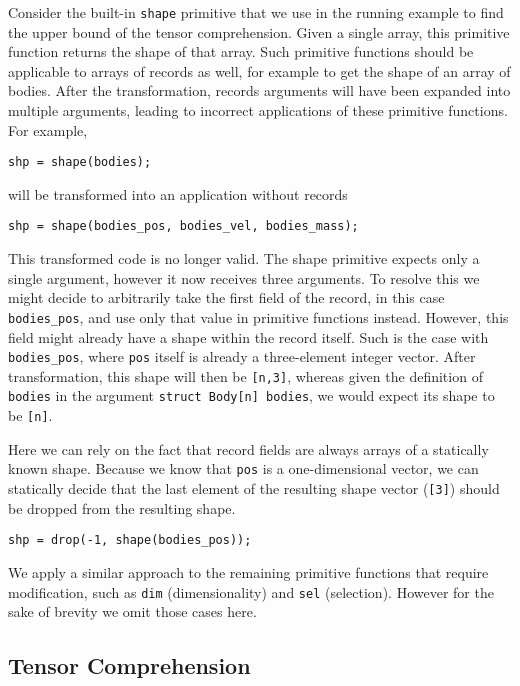 Consider the built-in \texttt{shape} primitive that we use in the running example to find the upper bound of the tensor comprehension.
Given a single array, this primitive function returns the shape of that array.
Such primitive functions should be applicable to arrays of records as well, for example to get the shape of an array of bodies.
After the transformation, records arguments will have been expanded into multiple arguments, leading to incorrect applications of these primitive functions.
For example,
%
\begin{lstlisting}
shp = shape(bodies);
\end{lstlisting}
%
will be transformed into an application without records
%
\begin{lstlisting}
shp = shape(bodies_pos, bodies_vel, bodies_mass);
\end{lstlisting}
%
This transformed code is no longer valid.
The shape primitive expects only a single argument, however it now receives three arguments.
To resolve this we might decide to arbitrarily take the first field of the record, in this case \texttt{bodies\_pos}, and use only that value in primitive functions instead.
However, this field might already have a shape within the record itself.
Such is the case with \texttt{bodies\_pos}, where \texttt{pos} itself is already a three-element integer vector.
After transformation, this shape will then be \texttt{[n,3]}, whereas given the definition of \texttt{bodies} in the argument \texttt{struct Body[n] bodies}, we would expect its shape to be \texttt{[n]}.

Here we can rely on the fact that record fields are always arrays of a statically known shape.
Because we know that \texttt{pos} is a one-dimensional vector, we can statically decide that the last element of the resulting shape vector (\texttt{[3]}) should be dropped from the resulting shape.
%
\begin{lstlisting}
shp = drop(-1, shape(bodies_pos));
\end{lstlisting}
%
We apply a similar approach to the remaining primitive functions that require modification, such as \texttt{dim} (dimensionality) and \texttt{sel} (selection).
However for the sake of brevity we omit those cases here.


\subsection{Tensor Comprehension}

